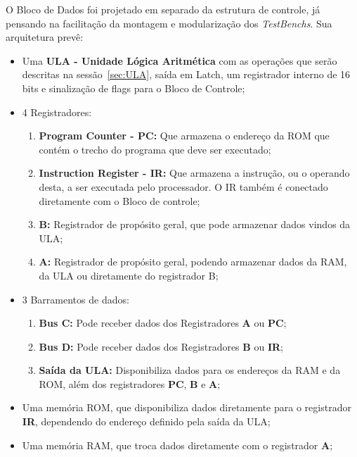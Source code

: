 \documentclass[../main.tex]{subfiles}
\begin{document}
	O Bloco de Dados foi projetado em separado da estrutura de controle, já pensando na facilitação da montagem e modularização dos \textit{TestBenchs}. Sua arquitetura prevê:
	\begin{itemize}
		\item Uma \textbf{ULA - Unidade Lógica Aritmética} com as operações que serão descritas na sessão~\ref{sec:ULA}, saída em Latch, um registrador interno de 16 bits e sinalização de flags para o Bloco de Controle;
		\item 4 Registradores:
			\begin{enumerate}
				\item \textbf{Program Counter - PC:} Que armazena o endereço da ROM que contém o trecho do programa que deve ser executado;
				\item \textbf{Instruction Register - IR:} Que armazena a instrução, ou o operando desta, a ser executada pelo processador. O IR também é conectado diretamente com o Bloco de controle;
				\item \textbf{B:} Registrador de propósito geral, que pode armazenar dados vindos da ULA;
				\item \textbf{A:} Registrador de propósito geral, podendo armazenar dados da RAM, da ULA ou diretamente do registrador B;
			\end{enumerate}
		\item 3 Barramentos de dados:
			\begin{enumerate}
				\item \textbf{Bus C:} Pode receber dados dos Registradores \textbf{A} ou \textbf{PC};
				\item \textbf{Bus D:} Pode receber dados dos Registradores \textbf{B} ou \textbf{IR};
				\item \textbf{Saída da ULA:} Disponibiliza dados para os endereços da RAM e da ROM, além dos registradores \textbf{PC}, \textbf{B} e \textbf{A};				
			\end{enumerate}
		\item Uma memória ROM, que disponibiliza dados diretamente para o registrador \textbf{IR}, dependendo do endereço definido pela saída da ULA;
		\item Uma memória RAM, que troca dados diretamente com o registrador \textbf{A};
	\end{itemize}
\end{document}
